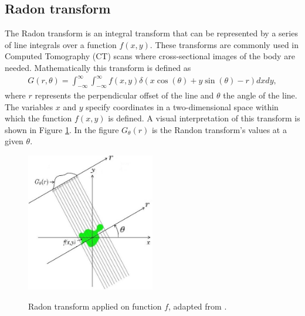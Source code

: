 \subsection{Radon transform}
\label{sec:RadonTransform}
The Radon transform is an integral transform that can be represented by a series of line integrals over a function $f(x,y)$. These transforms are commonly used in Computed Tomography (CT) scans where cross-sectional images of the body are needed. Mathematically this transform is defined as 
\begin{align}
G(r,\theta) = \int_{-\infty}^{\infty} \int_{-\infty}^{\infty} f(x, y) \delta(x\cos(\theta) + y\sin(\theta) - r) dx dy,
\label{eqn:radon}
\end{align}where $r$ represents the perpendicular offset of the line and $\theta$ the angle of the line. The variables $x$ and $y$ specify coordinates in a two-dimensional space within which the function $f(x,y)$ is defined.  A visual interpretation of this transform is shown in Figure \ref{fig:RadonT}. In the figure $G_\theta(r)$ is the Randon transform's values at a given $\theta$.
\begin{figure}[h]
  \centering
  \includegraphics[width=5.6cm]{RadonT}\\
  \caption{Radon transform applied on function $f$, adapted from \citet{radon}.}
  \label{fig:RadonT}
\end{figure}
